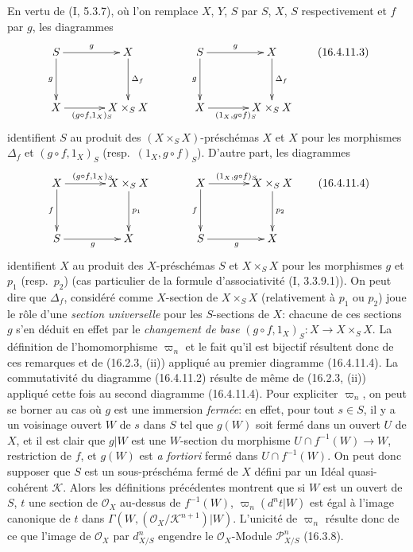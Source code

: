 En vertu de (I, 5.3.7), où l'on remplace $X$, $Y$, $S$ par $S$, $X$, $S$
respectivement et $f$ par $g$, les diagrammes
\[
  \xymatrix@=3pc{
    S\ar[r]^-g\ar[d]_-g&X\ar[d]^-{\Delta_f}
      &S\ar[r]^-g\ar[d]_-g&X\ar[d]^-{\Delta_f}\\
    X\ar[r]_{(g\circ f,1_X)_S}&X\times_S X
      &X\ar[r]_{(1_X,g\circ f)_S}&X\times_S X
  }
  \tag{16.4.11.3}
  \label{IV.16.4.11.3}
\]
identifient $S$ au produit des $(X\times_S X)$-préschémas $X$ et $X$ pour les
morphismes $\Delta_f$ et $(g\circ f,1_X)_S$ (resp.\ $(1_X,g\circ f)_S$).
D'autre part, les diagrammes
\[
  \xymatrix@=3pc{
    X\ar[r]^{(g\circ f,1_X)_S}\ar[d]_-f&X\times_S X\ar[d]^-{p_1}
      &X\ar[r]^{(1_X,g\circ f)_S}\ar[d]_-f&X\times_S X\ar[d]^-{p_2}\\
    S\ar[r]_{g}&X&S\ar[r]_{g}&X
  }
  \tag{16.4.11.4}
  \label{IV.16.4.11.4}
\]
identifient $X$ au produit des $X$-préschémas $S$ et $X\times_S X$ pour les
morphismes $g$ et $p_1$ (resp.\ $p_2$) (cas particulier de la formule
d'associativité (I, 3.3.9.1)). On peut dire que $\Delta_f$, considéré comme
$X$-section de $X\times_S X$ (relativement à $p_1$ ou $p_2$) joue le rôle
d'une \emph{section universelle} pour les $S$-sections de $X$: chacune de ces
sections $g$ s'en déduit en effet par le \emph{changement de base}
$(g\circ f,1_X)_S:X\to X\times_S X$. La définition de l'homomorphisme
$\varpi_n$ et le fait qu'il est bijectif résultent donc de ces remarques et de
(16.2.3, (ii)) appliqué au premier diagramme (16.4.11.4). La commutativité du
diagramme (16.4.11.2) résulte de même de (16.2.3, (ii)) appliqué cette fois au
second diagramme (16.4.11.4). Pour expliciter $\varpi_n$, on peut se borner au
cas où $g$ est une immersion \emph{fermée}: en effet, pour tout $s\in S$, il y
a un voisinage ouvert $W$ de $s$ dans $S$ tel que $g(W)$ soit fermé dans un
ouvert $U$ de $X$, et il est clair que $g|W$ est une $W$-section du morphisme
$U\cap f^{-1}(W)\to W$, restriction de $f$, et $g(W)$ est \emph{a fortiori}
fermé dans $U\cap f^{-1}(W)$. On peut donc supposer que $S$ est un
sous-préschéma fermé de $X$ défini par un Idéal quasi-cohérent $\mathscr{K}$.
Alors les définitions précédentes montrent que si $W$ est un ouvert de $S$,
$t$ une section de $\mathcal{O}_X$ au-dessus de $f^{-1}(W)$,
$\varpi_n(d^n t|W)$ est égal à l'image canonique de $t$ dans
$\Gamma(W,(\mathcal{O}_X/\mathscr{K}^{n+1})|W)$. L'unicité de $\varpi_n$
résulte donc de ce que l'image de $\mathcal{O}_X$ par $d_{X/S}^n$ engendre le
$\mathcal{O}_X$-Module $\mathscr{P}_{X/S}^n$ (16.3.8).

